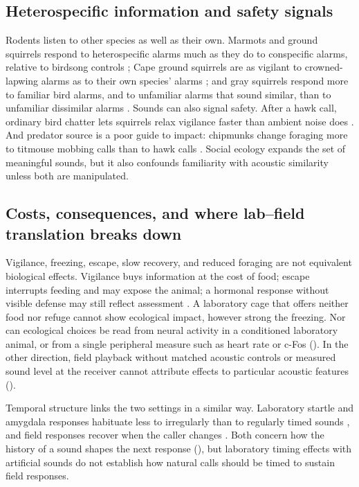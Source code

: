 \subsection{Heterospecific information and safety signals}
\label{sec:action-hetero}

Rodents listen to other species as well as their own. Marmots and ground squirrels respond to heterospecific alarms much as they do to conspecific alarms, relative to birdsong controls \citep{Shriner1998}; Cape ground squirrels are as vigilant to crowned-lapwing alarms as to their own species' alarms \citep{WatermanMai2020}; and gray squirrels respond more to familiar bird alarms, and to unfamiliar alarms that sound similar, than to unfamiliar dissimilar alarms \citep{GetschowEtAl2013}.
Sounds can also signal safety. After a hawk call, ordinary bird chatter lets squirrels relax vigilance faster than ambient noise does \citep{LillyEtAl2019}. And predator source is a poor guide to impact: chipmunks change foraging more to titmouse mobbing calls than to hawk calls \citep{SchmidtEtAl2008}. Social ecology expands the set of meaningful sounds, but it also confounds familiarity with acoustic similarity unless both are manipulated.

\subsection{Costs, consequences, and where lab--field translation breaks down}
\label{sec:action-costs}

Vigilance, freezing, escape, slow recovery, and reduced foraging are not equivalent biological effects. Vigilance buys information at the cost of food; escape interrupts feeding and may expose the animal; a hormonal response without visible defense may still reflect assessment \citep{EilamEtAl1999}. A laboratory cage that offers neither food nor refuge cannot show ecological impact, however strong the freezing. Nor can ecological choices be read from neural activity in a conditioned laboratory animal, or from a single peripheral measure such as heart rate or c-Fos (). In the other direction, field playback without matched acoustic controls or measured sound level at the receiver cannot attribute effects to particular acoustic features ().

Temporal structure links the two settings in a similar way. Laboratory startle and amygdala responses habituate less to irregularly than to regularly timed sounds \citep{Davis1970,HerryEtAl2007}, and field responses recover when the caller changes \citep{Hare1998}. Both concern how the history of a sound shapes the next response (), but laboratory timing effects with artificial sounds do not establish how natural calls should be timed to sustain field responses.


